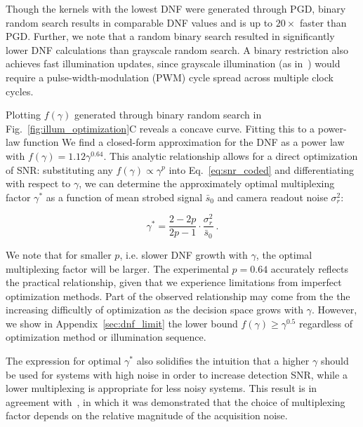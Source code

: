 Though the kernels with the lowest DNF were generated through PGD, binary random search results in comparable DNF values and is up to $20\times$ faster than PGD. Further, we note that a random binary search resulted in significantly lower DNF calculations than grayscale random search. A binary restriction also achieves fast illumination updates, since grayscale illumination (as in~\cite{Ma:15}) would require a pulse-width-modulation (PWM) cycle spread across multiple clock cycles.

Plotting $f(\gamma)$ generated through binary random search in Fig.~\ref{fig:illum_optimization}C reveals a concave curve. Fitting this to a power-law function We find a closed-form approximation for the DNF as a power law with $f(\gamma)=1.12\gamma^{0.64}$. This analytic relationship allows for a direct optimization of SNR: substituting any $f(\gamma) \propto \gamma^p$ into Eq.~\ref{eq:snr_coded} and differentiating with respect to $\gamma$, we can determine the approximately optimal multiplexing factor $\gamma^*$ as a function of mean strobed signal $\bar{s}_0$ and camera readout noise $\sigma_r^2$:

\begin{equation}
    \label{eq:optimal_gamma}
    \gamma^* = \frac{2-2p}{2p-1} \cdot \frac{\sigma_r^2}{\bar{s}_0}\:.
\end{equation}

We note that for smaller $p$, i.e. slower DNF growth with $\gamma$, the optimal multiplexing factor will be larger.
The experimental $p=0.64$ accurately reflects the practical relationship, given that we experience limitations from imperfect optimization methods. Part of the observed relationship may come from the the increasing difficultly of optimization as the decision space grows with $\gamma$. However, we show in Appendix~\ref{sec:dnf_limit} the lower bound $f(\gamma)\geq \gamma^{0.5}$ regardless of optimization method or illumination sequence.

The expression for optimal $\gamma^*$ also solidifies the intuition that a higher $\gamma$ should be used for systems with high noise in order to increase detection SNR, while a lower multiplexing is appropriate for less noisy systems. This result is in agreement with~\cite{agrawal2009optimal}, in which it was demonstrated that the choice of multiplexing factor depends on the relative magnitude of the acquisition noise.


